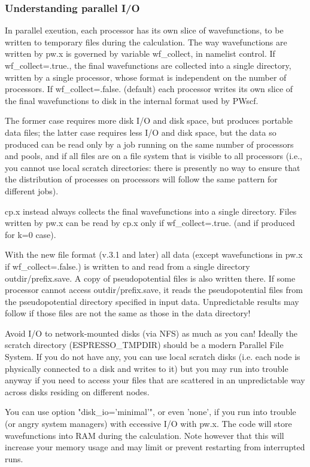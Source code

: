 \documentclass[12pt,a4paper]{article}
\begin{document}
\subsubsection{Understanding parallel I/O}
In parallel exeution, each processor has its own slice of wavefunctions, 
to be written to temporary files during the calculation. The way wavefunctions 
are written by pw.x is governed by variable wf\_collect, in namelist control. 
If wf\_collect=.true., the final wavefunctions are collected into a single 
directory, written by a single processor, whose format is independent on 
the number of processors. If wf\_collect=.false. (default) each processor
writes its own slice of the final 
wavefunctions to disk in the internal format used by PWscf. 

The former case requires more
disk I/O and disk space, but produces portable data files; the latter case
requires less I/O and disk space, but the data so produced can be read only
by a job running on the same number of processors and pools, and if
all files are on a file system that is visible to all processors
(i.e., you cannot use local scratch directories: there is presently no
way to ensure that the distribution of processes on processors will
follow the same pattern for different jobs).

cp.x instead always collects the final wavefunctions into a single directory.
Files written by pw.x can be read by cp.x only if wf\_collect=.true. (and if
produced for k=0 case). 

With the new file format (v.3.1 and later) all data (except 
wavefunctions in pw.x if wf\_collect=.false.) is written to and read from
a single directory outdir/prefix.save. A copy of pseudopotential files
is also written there. If some processor cannot access outdir/prefix.save,
it reads the pseudopotential files from the pseudopotential directory
specified in input data. Unpredictable results may follow if those files
are not the same as those in the data directory!

Avoid I/O to network-mounted disks (via NFS) as much as you can! 
Ideally the scratch directory (ESPRESSO\_TMPDIR) should be a modern 
Parallel File System. If you do not have any, you can use local
scratch disks (i.e. each node is physically connected to a disk
and writes to it) but you may run into trouble anyway if you 
need to access your files that are scattered in an unpredictable
way across disks residing on different nodes.

You can use option "disk\_io='minimal'", or even 'none', if you run
into trouble (or angry system managers) with eccessive I/O with pw.x. 
The code will store wavefunctions into RAM during the calculation.
Note however that this will increase your memory usage and may limit 
or prevent restarting from interrupted runs.
\end{document}
